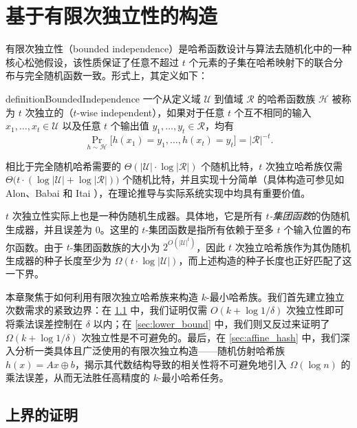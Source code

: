 \section{基于有限次独立性的构造}\label{sec:bounded_independence}

有限次独立性（bounded independence）是哈希函数设计与算法去随机化中的一种核心松弛假设，该性质保证了任意不超过 $t$ 个元素的子集在哈希映射下的联合分布与完全随机函数一致。形式上，其定义如下：

\begin{restatable}{definition}{BoundedIndependence}\label{def:t_wise_independence}
    一个从定义域 $\mathcal{U}$ 到值域 $\mathcal{R}$ 的哈希函数族 $\mathcal{H}$ 被称为 $t$ 次独立的（$t$-wise independent），如果对于任意 $t$ 个互不相同的输入 $x_1, \dots, x_t \in \mathcal{U}$ 以及任意 $t$ 个输出值 $y_1, \dots, y_t \in \mathcal{R}$，均有
    $$
    \Pr_{h \sim \mathcal{H}}\big[h(x_1)=y_1, \dots, h(x_t)=y_t\big] = |\mathcal{R}|^{-t}.
    $$
\end{restatable}

相比于完全随机哈希需要的 $\Theta(|\mathcal{U}| \cdot \log |\mathcal{R}|)$ 个随机比特，$t$ 次独立哈希族仅需 $\Theta\big(t \cdot (\log |\mathcal{U}| + \log |\mathcal{R}|)\big)$ 个随机比特，并且实现十分简单（具体构造可参见如 Alon、Babai 和 Itai \cite{ABI86_construction_t_wise}），在理论推导与实际系统实现中均具有重要价值。

$t$ 次独立性实际上也是一种伪随机生成器。具体地，它是所有 \emph{$t$-集团函数}的伪随机生成器，并且误差为 $0$。这里的 $t$-集团函数是指所有依赖于至多 $t$ 个输入位置的布尔函数。由于 $t$-集团函数族的大小为 $2^{O(|\mathcal{U}|^t)}$，因此 $t$ 次独立哈希族作为其伪随机生成器的种子长度至少为 $\Omega(t \cdot \log |\mathcal{U}|)$，而上述构造的种子长度也正好匹配了这一下界。

本章聚焦于如何利用有限次独立哈希族来构造 $k$-最小哈希族。我们首先建立独立次数需求的紧致边界：在 \ref{sec:upper_bound} 中，我们证明仅需 $O(k + \log 1 / \delta)$ 次独立性即可将乘法误差控制在 $\delta$ 以内；在 \ref{sec:lower_bound} 中，我们则又反过来证明了 $\Omega(k + \log 1 / \delta)$ 次独立性是不可避免的。最后，在 \ref{sec:affine_hash} 中，我们深入分析一类具体且广泛使用的有限次独立构造——随机仿射哈希族 $h(x) = Ax \oplus b$，揭示其代数结构导致的相关性将不可避免地引入 $\Omega(\log n)$ 的乘法误差，从而无法胜任高精度的 $k$-最小哈希任务。

\subsection{上界的证明}\label{sec:upper_bound}

